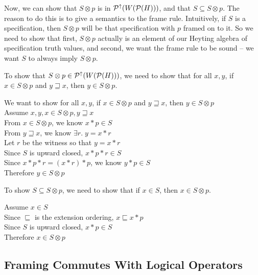 Now, we can show that $S \otimes p$ is in $\mathcal{P}^{\uparrow}({W(\mathcal{P}(H)}))$, and that 
$S \subseteq S \otimes p $. The reason to do this is to give a semantics
to the frame rule. Intuitively, if $S$ is a specification, then $S \otimes p$ 
will be that specification with $p$ framed on to it. So we need to show that
first, $S \otimes p$ actually is an element of our Heyting algebra of 
specification truth values, and second, we want the frame rule to be 
sound -- we want $S$ to always imply $S \otimes p$. 

To show that $S \otimes p \in \mathcal{P}^{\uparrow}({W(\mathcal{P}(H))})$, we need to show that for all 
$x,y$, if $x \in S \otimes p$ and $y \sqsupseteq x$, then $y \in S \otimes p$. 
\\

\begin{tabbedproof}
\oo We want to show for all $x,y$, if $x \in S \otimes p$ and $y \sqsupseteq x$, then $y \in S \otimes p$ \\
\oo Assume $x, y, x \in S \otimes p, y \sqsupseteq x$ \\
\ooo From $x \in S \otimes p$, we know $x * p \in S$ \\
\ooo From $y \sqsupseteq x$, we know $\exists r.\; y = x * r$ \\
\ooo Let $r$ be the witness so that $y = x * r$ \\
\oooo Since $S$ is upward closed, $x * p * r \in S$ \\
\oooo Since $x * p * r = (x * r) *p$, we know  $y * p \in S$ \\
\oooo Therefore $y \in S \otimes p$ \\
\end{tabbedproof}

To show $S \subseteq S \otimes p$, we need to show that if $x \in S$, then $x \in S \otimes p$. 

\begin{tabbedproof}
\oo Assume $x \in S$ \\
\ooo Since $\sqsubseteq$ is the extension ordering, $x \sqsubseteq x * p$ \\   
\ooo Since $S$ is upward closed, $x * p \in S$\\
\ooo Therefore $x \in S \otimes p$ \\
\end{tabbedproof}

\subsection{Framing Commutes With Logical Operators}

